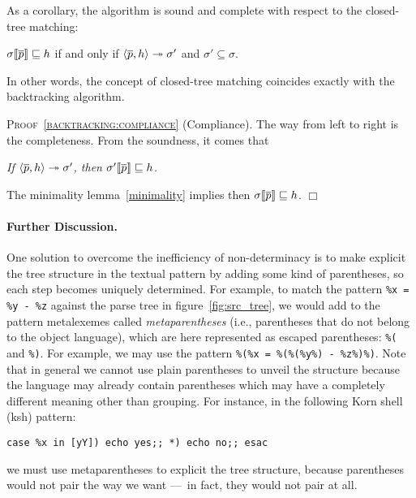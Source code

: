As a corollary, the algorithm is sound and complete with respect to
the closed\hyp{}tree matching:
\begin{corollary}[Compliance]\hfill
\label{backtracking:compliance}
\begin{center}
\(\subst{\overline{p}}{\sigma} \sqsubseteq h\) if and only if
\(\smat{h}{\overline{p}} \twoheadrightarrow \sigma'\) 
and  \(\sigma' \subseteq \sigma\).
\end{center}
\end{corollary}
\noindent In other words, the concept of closed\hyp{}tree matching
coincides exactly with the backtracking algorithm.

\medskip

\noindent\textsc{Proof~\ref{backtracking:compliance}}
(Compliance). The way from left to right is the completeness. From the
soundness, it comes that
\begin{center}\it
If \(\smat{h}{\overline{p}} \twoheadrightarrow \sigma'\), then
\(\subst{\overline{p}}{\sigma'} \sqsubseteq h\).
\end{center}
The minimality lemma~\ref{minimality} implies then
\(\subst{\overline{p}}{\sigma} \sqsubseteq h\). \(\Box\)

\paragraph{Further Discussion.}

One solution to overcome the inefficiency of non\hyp{}determinacy is
to make explicit the tree structure in the textual pattern by adding
some kind of parentheses, so each step becomes uniquely
determined. For example, to match the pattern \texttt{\%x = \%y - \%z}
against the parse tree in figure~\ref{fig:src_tree}, we would add to
the pattern meta\-lexemes called \emph{meta\-parentheses} (i.e.,
parentheses that do not belong to the object language), which are here
represented as escaped parentheses: \texttt{\%(} and \texttt{\%)}. For
example, we may use the pattern \texttt{\%(\%x = \%(\%(\%y\%) -
\%z\%)\%)}. Note that in general we cannot use plain parentheses to
unveil the structure because the language may already contain
parentheses which may have a completely different meaning other than
grouping. For instance, in the following \textsf{Korn shell}
(\textsf{ksh}) pattern:
\begin{verbatim} 
case %x in [yY]) echo yes;; *) echo no;; esac
\end{verbatim}
we must use meta\-parentheses to explicit the tree structure, because
parentheses would not pair the way we want ---~in fact, they would not
pair at all.

